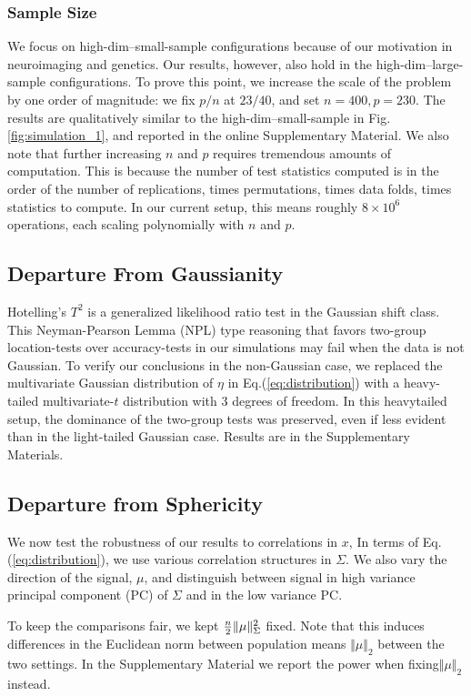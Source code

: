 \documentclass[oupdraft]{bio}
\begin{document}
\subsubsection{Sample Size}
We focus on high-dim--small-sample configurations because of our motivation in neuroimaging and genetics. 
Our results, however, also  hold in the high-dim--large-sample configurations.
To prove this point, we increase the scale of the problem by one order of magnitude: we fix $p/n$ at $23/40$, and set $n=400, p=230$. 
The results are qualitatively similar to the high-dim--small-sample in Fig.\ref{fig:simulation_1}, and reported in the online Supplementary Material.
We also note that further increasing $n$ and $p$ requires tremendous amounts of computation. 
This is because the number of test statistics computed is in the order of the number of replications, times permutations, times data folds, times statistics to compute. 
In our current setup, this means roughly $8 \times 10^6$ operations, each scaling polynomially with $n$ and $p$. 


\subsection{Departure From Gaussianity}
\label{sec:heavytailed}
Hotelling's $T^2$ is a generalized likelihood ratio test in the Gaussian shift class. 
This Neyman-Pearson Lemma (NPL) type reasoning that favors two-group location-tests over accuracy-tests in our simulations may fail when the data is not Gaussian.
To verify our conclusions in the non-Gaussian case, we replaced the multivariate Gaussian distribution of $\eta$ in Eq.(\ref{eq:distribution}) with a heavy-tailed multivariate-$t$ distribution with $3$ degrees of freedom. In this heavytailed setup, the dominance of the two-group tests was preserved, even if less evident than in the light-tailed Gaussian case.  
Results are in the Supplementary Materials.

\subsection{Departure from Sphericity}
\label{sec:dependence}
We now test the robustness of our results to correlations in $x$, 
In terms of Eq.(\ref{eq:distribution}), we use various correlation structures in $\Sigma$.
We also vary the direction of the signal, $\mu$, and distinguish between signal in high variance principal component (PC) of $\Sigma$ and in the low variance PC. 

To keep the comparisons fair, we kept $\frac{n}{2}\Vert \mu \Vert^2_\Sigma$ fixed.
Note that this induces differences in the Euclidean norm between population means $\Vert \mu \Vert_2$ between the two settings.
In the Supplementary Material we report the power when fixing$\Vert \mu \Vert_2$ instead.
\end{document}
